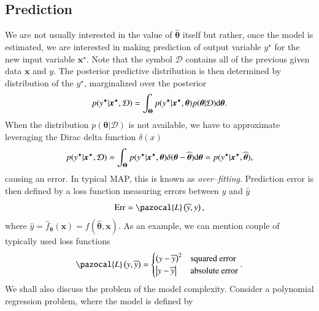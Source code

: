 \subsection{Prediction}
We are not usually interested in the value of $\widehat{\boldsymbol{\theta}}$ itself but rather, once the model is estimated, we are interested in making prediction of output variable $y^{\star}$ for the new input variable $\boldsymbol{x}^{\star}$. Note that the symbol $\mathcal{D}$ contains all of the previous given data $\boldsymbol{x}$ and $y$. The posterior predictive distribution is then determined by distribution of the $y^{\star}$, marginalized over the posterior
\begin{equation}
	p(y^{\star} | \boldsymbol{x}^{\star}, \mathcal{D}) =   \int_{\boldsymbol{\Theta}} p(y^{\star}|\boldsymbol{x}^{\star}, \boldsymbol{\theta}) p(\boldsymbol{\theta}|\mathcal{D}) \mathrm{d}\boldsymbol{\theta}.
\end{equation} 
When the distribution $p(\boldsymbol{\theta}|\mathcal{D})$ is not available, we have to approximate leveraging the Dirac delta function $\delta(x)$  
\begin{equation}
p(y^{\star} | \boldsymbol{x}^{\star}, \mathcal{D}) = \int_{\boldsymbol{\Theta}} 	p(y^{\star}|\boldsymbol{x}^{\star}, \boldsymbol{\theta}) \delta(\boldsymbol{\theta} - \widehat{\boldsymbol{\theta}})\mathrm{d}\boldsymbol{\theta} = p(y^{\star}|\boldsymbol{x}^{\star}, \widehat{\boldsymbol{\theta}}),
\end{equation}
causing an error. In typical MAP, this is known as \emph{over--fitting}. Prediction error is then defined by a loss function measuring errors between $y$ and $\widehat{y}$
\begin{equation}
	\mathrm{Err} = \pazocal{L}\left(\widehat{y}, y \right),
\end{equation}	
where $\widehat{y} = \widehat{f}_{\boldsymbol{\theta}}\left(\boldsymbol{x}\right) = f(\widehat{\boldsymbol{\theta}}, \boldsymbol{x})$.  As an example, we can mention couple of typically used loss functions 
\begin{equation}
\pazocal{L}\left(y,\widehat{y} \right) =
 \begin{cases}
	 \left(y - \widehat{y}\right)^2& \text{squared error}\\
	 \abs{y - \widehat{y}} & \text{absolute error}\\
\end{cases}   .
\end{equation}
We shall also discuss the problem of the model complexity. Consider a polynomial regression problem,  where the model is defined by
